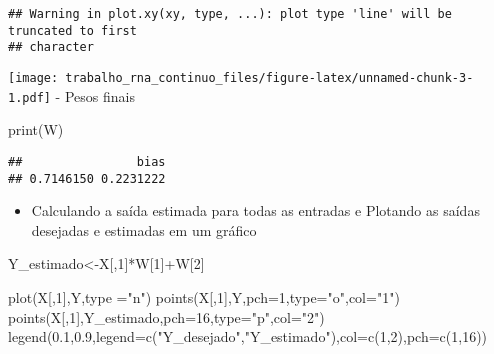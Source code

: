 \documentclass[
]{article}
\newenvironment{Shaded}{\begin{snugshade}}{\end{snugshade}}
\newcommand{\AttributeTok}[1]{\textcolor[rgb]{0.77,0.63,0.00}{#1}}
\newcommand{\DecValTok}[1]{\textcolor[rgb]{0.00,0.00,0.81}{#1}}
\newcommand{\FloatTok}[1]{\textcolor[rgb]{0.00,0.00,0.81}{#1}}
\newcommand{\FunctionTok}[1]{\textcolor[rgb]{0.00,0.00,0.00}{#1}}
\newcommand{\NormalTok}[1]{#1}
\newcommand{\OtherTok}[1]{\textcolor[rgb]{0.56,0.35,0.01}{#1}}
\newcommand{\SpecialCharTok}[1]{\textcolor[rgb]{0.00,0.00,0.00}{#1}}
\newcommand{\StringTok}[1]{\textcolor[rgb]{0.31,0.60,0.02}{#1}}
\providecommand{\tightlist}{%
  \setlength{\itemsep}{0pt}\setlength{\parskip}{0pt}}
\begin{document}
\begin{verbatim}
## Warning in plot.xy(xy, type, ...): plot type 'line' will be truncated to first
## character
\end{verbatim}

\texttt{[image: trabalho\_rna\_continuo\_files/figure-latex/unnamed-chunk-3-1.pdf]}
- Pesos finais

\begin{Shaded}
\begin{Highlighting}[]
\FunctionTok{print}\NormalTok{(W)}
\end{Highlighting}
\end{Shaded}

\begin{verbatim}
##                bias 
## 0.7146150 0.2231222
\end{verbatim}

\begin{itemize}
\tightlist
\item
  Calculando a saída estimada para todas as entradas e Plotando as
  saídas desejadas e estimadas em um gráfico
\end{itemize}

\begin{Shaded}
\begin{Highlighting}[]
\NormalTok{Y\_estimado}\OtherTok{\textless{}{-}}\NormalTok{X[,}\DecValTok{1}\NormalTok{]}\SpecialCharTok{*}\NormalTok{W[}\DecValTok{1}\NormalTok{]}\SpecialCharTok{+}\NormalTok{W[}\DecValTok{2}\NormalTok{]}

\FunctionTok{plot}\NormalTok{(X[,}\DecValTok{1}\NormalTok{],Y,}\AttributeTok{type =}\StringTok{"n"}\NormalTok{)}
\FunctionTok{points}\NormalTok{(X[,}\DecValTok{1}\NormalTok{],Y,}\AttributeTok{pch=}\DecValTok{1}\NormalTok{,}\AttributeTok{type=}\StringTok{"o"}\NormalTok{,}\AttributeTok{col=}\StringTok{"1"}\NormalTok{)}
\FunctionTok{points}\NormalTok{(X[,}\DecValTok{1}\NormalTok{],Y\_estimado,}\AttributeTok{pch=}\DecValTok{16}\NormalTok{,}\AttributeTok{type=}\StringTok{"p"}\NormalTok{,}\AttributeTok{col=}\StringTok{"2"}\NormalTok{)}
\FunctionTok{legend}\NormalTok{(}\FloatTok{0.1}\NormalTok{,}\FloatTok{0.9}\NormalTok{,}\AttributeTok{legend=}\FunctionTok{c}\NormalTok{(}\StringTok{"Y\_desejado"}\NormalTok{,}\StringTok{"Y\_estimado"}\NormalTok{),}\AttributeTok{col=}\FunctionTok{c}\NormalTok{(}\DecValTok{1}\NormalTok{,}\DecValTok{2}\NormalTok{),}\AttributeTok{pch=}\FunctionTok{c}\NormalTok{(}\DecValTok{1}\NormalTok{,}\DecValTok{16}\NormalTok{))}
\end{Highlighting}
\end{Shaded}
\end{document}
